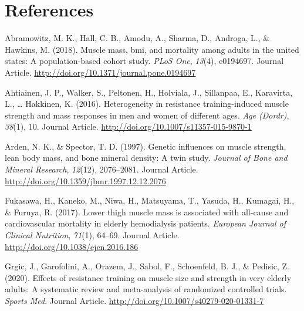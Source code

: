 \documentclass[twoside,10pt]{gihclass} %
\begin{document}
\backmatter

\hypertarget{references}{%
\chapter*{References}\label{references}}


\noindent

\setlength{\parindent}{-0.20in}
\setlength{\leftskip}{0.20in}
\setlength{\parskip}{8pt}

\hypertarget{refs}{}
\leavevmode\hypertarget{ref-RN2516}{}%
Abramowitz, M. K., Hall, C. B., Amodu, A., Sharma, D., Androga, L., \& Hawkins, M. (2018). Muscle mass, bmi, and mortality among adults in the united states: A population-based cohort study. \emph{PLoS One}, \emph{13}(4), e0194697. Journal Article. \url{http://doi.org/10.1371/journal.pone.0194697}

\leavevmode\hypertarget{ref-RN1741}{}%
Ahtiainen, J. P., Walker, S., Peltonen, H., Holviala, J., Sillanpaa, E., Karavirta, L., \ldots{} Hakkinen, K. (2016). Heterogeneity in resistance training-induced muscle strength and mass responses in men and women of different ages. \emph{Age (Dordr)}, \emph{38}(1), 10. Journal Article. \url{http://doi.org/10.1007/s11357-015-9870-1}

\leavevmode\hypertarget{ref-RN2526}{}%
Arden, N. K., \& Spector, T. D. (1997). Genetic influences on muscle strength, lean body mass, and bone mineral density: A twin study. \emph{Journal of Bone and Mineral Research}, \emph{12}(12), 2076--2081. Journal Article. \url{http://doi.org/10.1359/jbmr.1997.12.12.2076}

\leavevmode\hypertarget{ref-RN2513}{}%
Fukasawa, H., Kaneko, M., Niwa, H., Matsuyama, T., Yasuda, H., Kumagai, H., \& Furuya, R. (2017). Lower thigh muscle mass is associated with all-cause and cardiovascular mortality in elderly hemodialysis patients. \emph{European Journal of Clinical Nutrition}, \emph{71}(1), 64--69. Journal Article. \url{http://doi.org/10.1038/ejcn.2016.186}

\leavevmode\hypertarget{ref-RN2534}{}%
Grgic, J., Garofolini, A., Orazem, J., Sabol, F., Schoenfeld, B. J., \& Pedisic, Z. (2020). Effects of resistance training on muscle size and strength in very elderly adults: A systematic review and meta-analysis of randomized controlled trials. \emph{Sports Med}. Journal Article. \url{http://doi.org/10.1007/s40279-020-01331-7}
\end{document}
